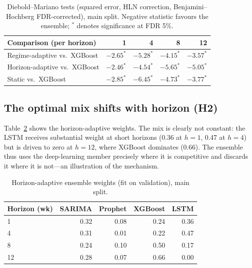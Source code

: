 \documentclass[11pt]{article}
\begin{document}
\begin{table}[t]\centering
\caption{Diebold--Mariano tests (squared error, HLN correction, Benjamini--Hochberg FDR-corrected),
main split. Negative statistic favours the ensemble; $^\ast$ denotes significance at FDR 5\%.}
\label{tab:dm}
\small
\begin{tabular}{l rrrr}
\toprule
Comparison (per horizon) & 1 & 4 & 8 & 12\\
\midrule
Regime-adaptive vs.\ XGBoost & $-2.65^\ast$ & $-5.28^\ast$ & $-4.15^\ast$ & $-3.57^\ast$\\
Horizon-adaptive vs.\ XGBoost & $-2.46^\ast$ & $-4.54^\ast$ & $-5.65^\ast$ & $-5.05^\ast$\\
Static vs.\ XGBoost & $-2.85^\ast$ & $-6.45^\ast$ & $-4.73^\ast$ & $-3.77^\ast$\\
\bottomrule
\end{tabular}
\end{table}

\subsection{The optimal mix shifts with horizon (H2)}
Table~\ref{tab:weights} shows the horizon-adaptive weights. The mix is clearly not constant: the LSTM
receives substantial weight at short horizons (0.36 at $h{=}1$, 0.47 at $h{=}4$) but is driven to zero
at $h{=}12$, where XGBoost dominates (0.66). The ensemble thus uses the deep-learning member precisely
where it is competitive and discards it where it is not---an illustration of the mechanism.

\begin{table}[t]\centering
\caption{Horizon-adaptive ensemble weights (fit on validation), main split.}
\label{tab:weights}
\small
\begin{tabular}{l rrrr}
\toprule
Horizon (wk) & SARIMA & Prophet & XGBoost & LSTM\\
\midrule
1  & 0.32 & 0.08 & 0.24 & 0.36\\
4  & 0.31 & 0.01 & 0.22 & 0.47\\
8  & 0.24 & 0.10 & 0.50 & 0.17\\
12 & 0.28 & 0.07 & 0.66 & 0.00\\
\bottomrule
\end{tabular}
\end{table}
\end{document}

